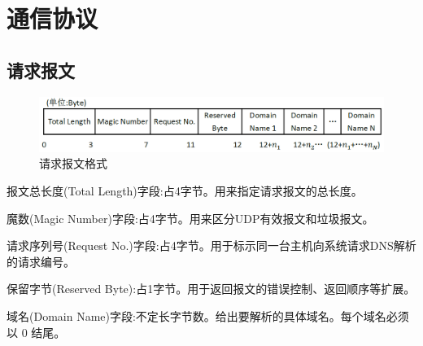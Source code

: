 %
%
%
\section{通信协议}
\subsection{请求报文}
\begin{figure}[H]
\centering
\includegraphics[keepaspectratio, scale=0.4]{pitures/request.png}
\caption{请求报文格式}
\end{figure}
	\begin{asparaitem}
		\item{报文总长度(Total Length)字段:占4字节。用来指定请求报文的总长度。}
		\item{魔数(Magic Number)字段:占4字节。用来区分UDP有效报文和垃圾报文。}
		\item{请求序列号(Request No.)字段:占4字节。用于标示同一台主机向系统请求DNS解析的请求编号。}
		\item{保留字节(Reserved Byte):占1字节。用于返回报文的错误控制、返回顺序等扩展。}
		\item{域名(Domain Name)字段:不定长字节数。给出要解析的具体域名。每个域名必须以 0 结尾。}
	\end{asparaitem}

